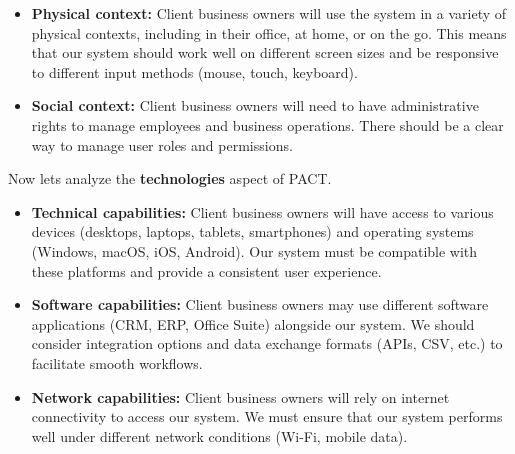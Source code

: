 \documentclass[]{VUMIFTemplateClass}
\begin{document}
\begin{itemize}
    \item \textbf{Physical context:} Client business owners will use the system
    in a variety of physical contexts, including in their office, at home, or
    on the go. This means that our system should work well on different screen
    sizes and be responsive to different input methods (mouse, touch, keyboard).
    \item \textbf{Social context:} Client business owners will need to have administrative
    rights to manage employees and business operations. There should be a clear
    way to manage user roles and permissions.
\end{itemize}

Now lets analyze the \textbf{technologies} aspect of PACT.

\begin{itemize}
    \item \textbf{Technical capabilities:} Client business owners will have
    access to various devices (desktops, laptops, tablets, smartphones) and
    operating systems (Windows, macOS, iOS, Android). Our system must be
    compatible with these platforms and provide a consistent user experience.
    \item \textbf{Software capabilities:} Client business owners may use
    different software applications (CRM, ERP, Office Suite) alongside our
    system. We should consider integration options and data exchange formats
    (APIs, CSV, etc.) to facilitate smooth workflows.
    \item \textbf{Network capabilities:} Client business owners will rely on
    internet connectivity to access our system. We must ensure that our system
    performs well under different network conditions (Wi-Fi, mobile data).
\end{itemize}

\printbibliography[title = {References and sources}]


\end{document}
